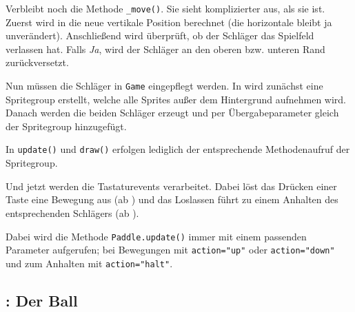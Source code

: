 
Verbleibt noch die Methode \texttt{\_move()}. Sie sieht komplizierter aus, als sie ist. Zuerst wird in  die neue vertikale Position berechnet (die horizontale bleibt ja unverändert). Anschließend wird überprüft, ob der Schläger das Spielfeld verlassen hat. Falls \emph{Ja}, wird der Schläger an den oberen bzw. unteren Rand zurückversetzt.


Nun müssen die Schläger in \texttt{Game} eingepflegt werden. In  wird zunächst eine Spritegroup erstellt, welche alle Sprites außer dem Hintergrund aufnehmen wird. Danach werden die beiden Schläger erzeugt und per Übergabeparameter gleich der Spritegroup hinzugefügt.


In \texttt{update()} und \texttt{draw()} erfolgen lediglich der entsprechende Methodenaufruf der Spritegroup.


Und jetzt werden die Tastaturevents verarbeitet. Dabei löst das Drücken einer Taste eine Bewegung aus (ab ) und das Loslassen führt zu einem Anhalten des entsprechenden Schlägers (ab ). 

Dabei wird die Methode \texttt{Paddle.update()} immer mit einem passenden Parameter aufgerufen; bei Bewegungen mit \verb+action="up"+ oder \verb+action="down"+ und zum Anhalten mit \verb+action="halt"+.



\subsection{: Der Ball}

